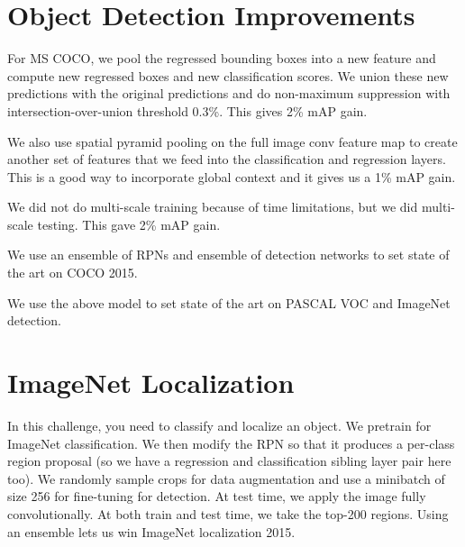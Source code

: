 \documentclass[a4paper]{article}
\begin{document}
\section{Object Detection Improvements}
For MS COCO, we pool the regressed bounding boxes into a new feature and
compute new regressed boxes and new classification scores. We union these
new predictions with the original predictions and do non-maximum suppression
with intersection-over-union threshold 0.3\%. This gives 2\% mAP gain.

We also use spatial pyramid pooling on the full image conv feature map to
create another set of features that we feed into the classification and
regression layers. This is a good way to incorporate global context and it
gives us a 1\% mAP gain.

We did not do multi-scale training because of time limitations, but we did
multi-scale testing. This gave 2\% mAP gain.

We use an ensemble of RPNs and ensemble of detection networks to set state of
the art on COCO 2015.

We use the above model to set state of the art on PASCAL VOC and ImageNet
detection.

\section{ImageNet Localization}
In this challenge, you need to classify and localize an object. We pretrain
for ImageNet classification. We then modify the RPN so that it produces a
per-class region proposal (so we have a regression and classification sibling
layer pair here too). We randomly sample crops for data augmentation and use
a minibatch of size 256 for fine-tuning for detection. At test time, we apply
the image fully convolutionally. At both train and test time, we take the
top-200 regions. Using an ensemble lets us win ImageNet localization 2015.
\end{document}
